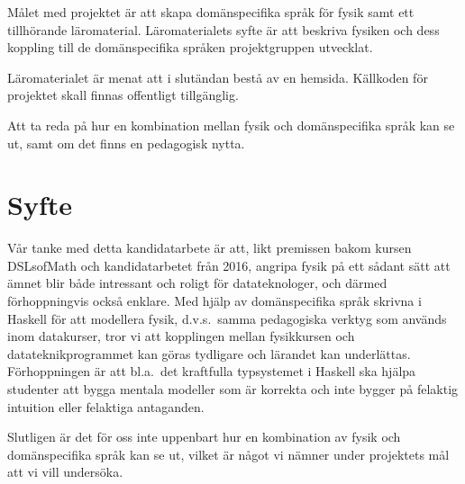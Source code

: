 \begin{draft}

Målet med projektet är att skapa domänspecifika språk för fysik samt ett   
tillhörande läromaterial. Läromaterialets syfte är att beskriva fysiken och
dess koppling till de domänspecifika språken projektgruppen utvecklat.

Läromaterialet är menat att i slutändan bestå av en hemsida. Källkoden för projektet
skall finnas offentligt tillgänglig.

Att ta reda på hur en kombination mellan fysik och domänspecifika språk kan se ut, samt om det finns en pedagogisk nytta.   %


\end{draft}

\section{Syfte}

\begin{draft}
\iffalse
Nedan beskrivs hur att vi vill väcka intresse för fysik hos
datateknologer genom att presentera fysik ur ett annat perspektiv.
\fi

Vår tanke med detta kandidatarbete är att, likt premissen bakom kursen DSLsofMath
och kandidatarbetet från 2016, angripa fysik på ett sådant sätt att ämnet blir både
intressant och roligt för datateknologer, och därmed förhoppningvis
också enklare. Med hjälp av domänspecifika språk skrivna i Haskell för att
modellera fysik, d.v.s.\ samma pedagogiska verktyg som används inom           %
datakurser, tror vi att kopplingen mellan fysikkursen och
datateknikprogrammet kan göras tydligare och lärandet kan underlättas.
Förhoppningen är att bl.a.\ det kraftfulla typsystemet i Haskell ska
hjälpa studenter att bygga mentala modeller som är korrekta och inte
bygger på felaktig intuition eller felaktiga antaganden.

Slutligen är det för oss inte uppenbart hur en kombination av fysik och domänspecifika språk kan se ut,
vilket är något vi nämner under projektets mål att vi vill undersöka.

\end{draft}

